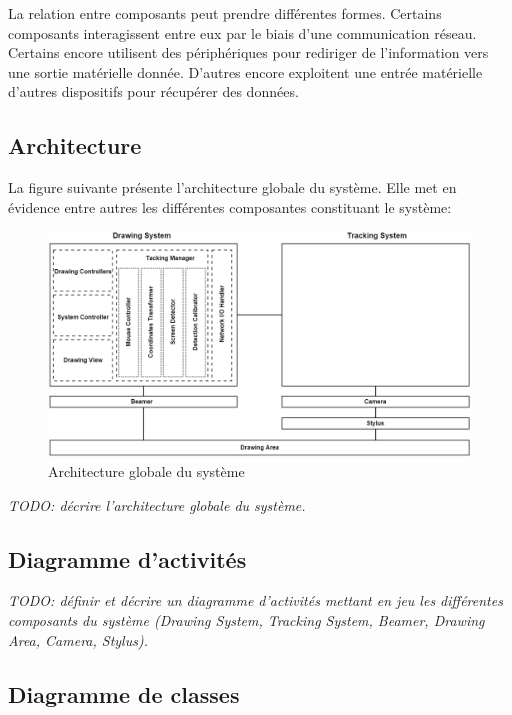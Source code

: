\documentclass[11pt,a4paper,oldfontcommands]{memoir}
\begin{document}
La relation entre composants peut prendre différentes formes. Certains composants interagissent entre eux par le biais d'une communication réseau. Certains encore utilisent des périphériques pour rediriger de l'information vers une sortie matérielle donnée. D'autres encore exploitent une entrée matérielle d'autres dispositifs pour récupérer des données.

\newpage

\subsection{Architecture}

La figure suivante présente l'architecture globale du système. Elle met en évidence entre autres les différentes composantes constituant le système:

\begin{figure}[h]
\centering
\includegraphics[scale=0.55]{images/global-system-architecture.png}
\caption{Architecture globale du système}
\end{figure}

\textit{TODO: décrire l'architecture globale du système.}

\subsection{Diagramme d'activités}

\textit{TODO: définir et décrire un diagramme d'activités mettant en jeu les différentes composants du système (Drawing System, Tracking System, Beamer, Drawing Area, Camera, Stylus).}

\subsection{Diagramme de classes}
\end{document}
